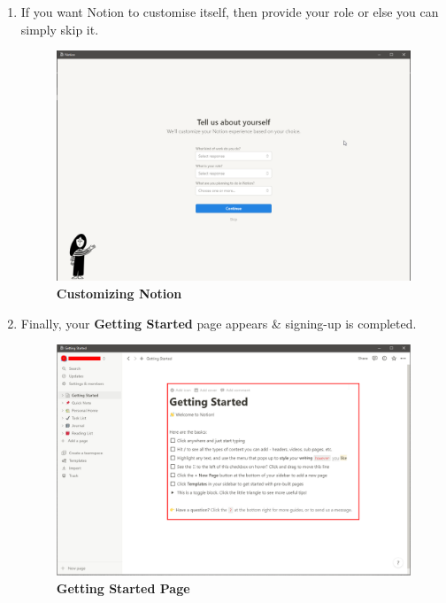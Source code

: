 \begin{enumerate}
\newpage
    \item If you want Notion to customise itself, then provide your role or else you can simply skip it.
        \begin{figure}[h]
        \centering
        \includegraphics[scale=0.4]{gfx/12.png}
        \caption{\textbf{Customizing Notion}}
        \label{fig: Sign_up_Notion}
        \end{figure} 
\newpage
    \item Finally, your \textbf{Getting Started} page appears \& signing-up is completed.
        \begin{figure}[h]
            \centering
            \includegraphics[scale=0.4]{gfx/13.png}
            \caption{\textbf{Getting Started Page}}
            \label{fig: Get_started}
        \end{figure}
\end{enumerate}